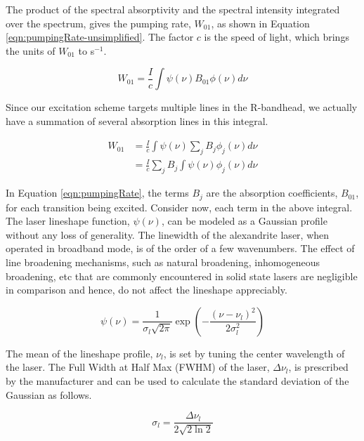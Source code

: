The product of the spectral absorptivity and the spectral intensity integrated over the spectrum, gives the pumping rate, \(W_{01}\), as shown in Equation \ref{eqn:pumpingRate-unsimplified}.
The factor \(c\) is the speed of light, which brings the units of \(W_{01}\) to s\(^{-1}\).

\begin{equation}
  W_{01} = \frac{I}{c} \int \psi(\nu) B_{01}\phi(\nu) d\nu
  \label{eqn:pumpingRate-unsimplified}
\end{equation}

Since our excitation scheme targets multiple lines in the R-bandhead, we actually have a summation of several absorption lines in this integral.

\begin{align}
  W_{01} & = \frac{I}{c} \int \psi(\nu) \sum_j B_j \phi_j (\nu) d\nu \nonumber \\
        & = \frac{I}{c} \sum_j B_j \int \psi(\nu)\phi_j(\nu) d\nu
  \label{eqn:pumpingRate}
\end{align}

In Equation \ref{eqn:pumpingRate}, the terms \(B_j\) are the absorption coefficients, \(B_{01}\), for each transition being excited.
Consider now, each term in the above integral.
The laser lineshape function, \(\psi(\nu)\), can be modeled as a Gaussian profile without any loss of generality.
The linewidth of the alexandrite laser, when operated in broadband mode, is of the order of a few wavenumbers.
The effect of line broadening mechanisms, such as natural broadening, inhomogeneous broadening, etc that are commonly encountered in solid state lasers are negligible in comparison and hence, do not affect the lineshape appreciably.

\begin{equation}
  \psi(\nu) = \frac{1}{\sigma_l\sqrt{2\pi}} \exp{\left(-\dfrac{(\nu-\nu_l)^2}{2\sigma_l^2}\right)}
  \label{eqn:laserLineShape}
\end{equation}

The mean of the lineshape profile, \(\nu_l\), is set by tuning the center wavelength of the laser.
The Full Width at Half Max (FWHM) of the laser, \(\Delta\nu_l\), is prescribed by the manufacturer and can be used to calculate the standard deviation of the Gaussian as follows.

\begin{equation}
  \sigma_l = \frac{\Delta\nu_l}{2 \sqrt{ 2 \ln{2} } }
\end{equation}

